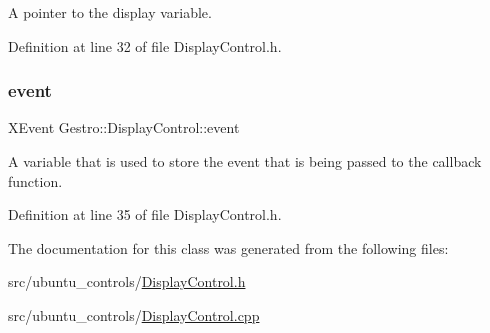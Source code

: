 A pointer to the display variable. 



Definition at line 32 of file Display\+Control.\+h.

\mbox{\label{class_gestro_1_1_display_control_a1bf9a5a6abafb845fe5bbeb7e84f715d}} 
\subsubsection{\texorpdfstring{event}{event}}
{\footnotesize\ttfamily X\+Event Gestro\+::\+Display\+Control\+::event\hspace{0.3cm}{\ttfamily [private]}}



A variable that is used to store the event that is being passed to the callback function. 



Definition at line 35 of file Display\+Control.\+h.



The documentation for this class was generated from the following files\+:\begin{DoxyCompactItemize}
\item 
src/ubuntu\+\_\+controls/\hyperlink{_display_control_8h}{Display\+Control.\+h}\item 
src/ubuntu\+\_\+controls/\hyperlink{_display_control_8cpp}{Display\+Control.\+cpp}\end{DoxyCompactItemize}
